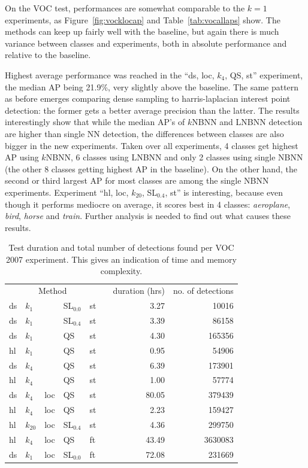 On the VOC test, performances are somewhat comparable to the $k=1$ experiments, as Figure~\ref{fig:vocklocap} and Table~\ref{tab:vocallaps} show. 
The methods can keep up fairly well with the baseline, but again there is much variance between classes and experiments, both in absolute performance and relative to the baseline.

Highest average performance was reached in the ``ds, loc, $k_4$, QS, st'' experiment, the median AP being 21.9\%, very slightly above the baseline. The same pattern as before emerges comparing dense sampling to harris-laplacian interest point detection: the former gets a better average precision than the latter. The results interestingly show that while the median AP's of $k$NBNN and LNBNN detection are higher than single NN detection, the differences between classes are also bigger in the new experiments. Taken over all experiments, 4 classes get highest AP using $k$NBNN, 6 classes using LNBNN and only 2 classes using single NBNN (the other 8 classes getting highest AP in the baseline). On the other hand, the second or third largest AP for most classes are among the single NBNN experiments. Experiment ``hl, loc, $k_{20}$, SL$_{0.4}$, st'' is interesting, because even though it performs mediocre on average, it scores best in 4 classes: \emph{aeroplane}, \emph{bird}, \emph{horse} and \emph{train}. Further analysis is needed to find out what causes these results.

\begin{table}[bt]
    \centering
    \caption{Test duration and total number of detections found per VOC 2007 experiment. This gives an indication of time and memory complexity.}
    \label{tab:vocalldurdet}
    \begin{tabular}{@{}lllllcrr@{}}
    \toprule
    \multicolumn{5}{c}{Method} & \phantom{abc} & duration (hrs) & no. of detections\\
    \cmidrule{1-5} \cmidrule{7-8}
    ds & $k_1$    &     & SL$_{0.0}$ & st && 3.27&10016\\
    ds & $k_1$    &     & SL$_{0.4}$ & st && 3.39&86158\\
    ds & $k_1$    &     & QS         & st && 4.30&165356\\
    hl & $k_1$    &     & QS         & st && 0.95&54906\\
    ds & $k_4$    &     & QS         & st && 6.39&173901\\
    hl & $k_4$    &     & QS         & st && 1.00&57774\\
    ds & $k_4$    & loc & QS         & st && 80.05&379439\\
    hl & $k_4$    & loc & QS         & st && 2.23&159427\\
    hl & $k_{20}$ & loc & SL$_{0.4}$ & st && 4.36&299750\\
    hl & $k_4$    & loc & QS         & ft && 43.49&3630083\\
    ds & $k_1$    & loc & SL$_{0.0}$ & ft && 72.08&231669\\
    \bottomrule
    \end{tabular}

\end{table}

